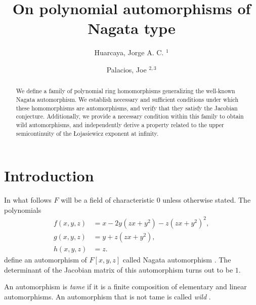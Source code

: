 \documentclass{amsart}
\title{On polynomial automorphisms of Nagata type}
\author{Huarcaya, Jorge A. C.  $^{1}$}
\author{Palacios, Joe $^{2,3}$}
\date{}
\begin{document}
	
	
	
	
	\begin{abstract}
			We define a family of polynomial ring homomorphisms generalizing the well-known Nagata automorphism. We establish necessary and sufficient conditions under which these homomorphisms are automorphisms, and verify that they satisfy the Jacobian conjecture.  
		 Additionally, we provide a necessary condition within this family to obtain wild automorphisms, and independently derive a property related to the upper semicontinuity of the \L{}ojasiewicz exponent at infinity. 
	\end{abstract}
	
	
	
	
	\maketitle
	
	
	\tableofcontents
	
\section{Introduction}





In what follows $F$ will be a field of characteristic $0$ unless otherwise stated. The polynomials 
\begin{equation}\label{nagaut}
	\begin{split}
		f(x,y,z)&=x-2y(zx+y^2)-z(zx+y^2)^2,\\
		g(x,y,z)&=y+z(zx+y^2),\\
		h(x,y,z)&=z.   
	\end{split}
\end{equation}
define an automorphism of $F[x,y,z]$ called Nagata automorphism \cite{Nag72}.
The determinant of the Jacobian matrix of this automorphism turns out to be $1$.





An automorphism is {\em tame} if it is  a finite composition of elementary and linear automorphisms. An automorphism that is not tame is called {\em wild} \cite{SU04}.
\end{document}
